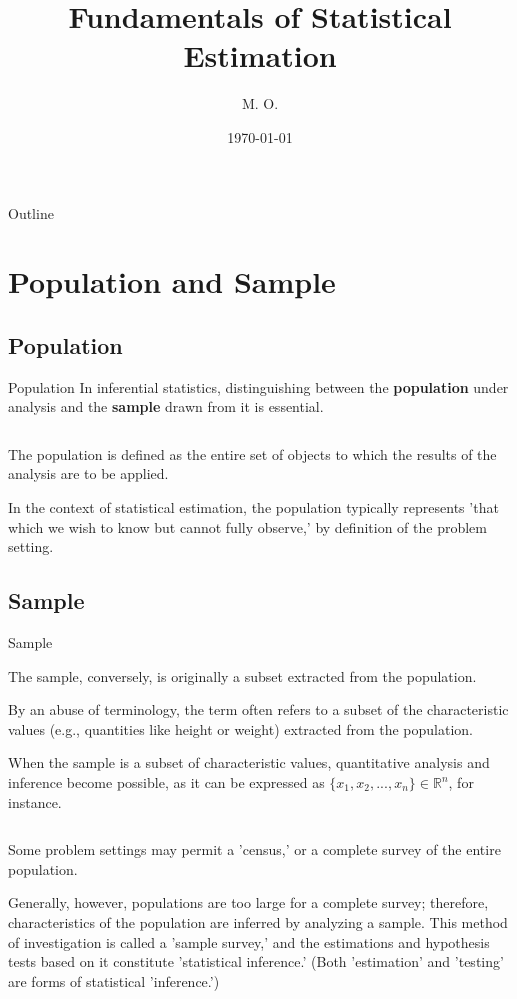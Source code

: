\documentclass[dvipdfmx, autodetect-engine, aspectratio=169, 10.5pt]{beamer}
\title{Fundamentals of Statistical Estimation}
\author{M. O.}
\date{\today}
\begin{document}
\begin{frame}[plain]
	\titlepage
\end{frame}

\begin{frame}{Outline}
	\tableofcontents
\end{frame}

\section{Population and Sample}

\subsection{Population}

\begin{frame}{Population}
	In inferential statistics, distinguishing between the \textbf{population} under analysis and the \textbf{sample} drawn from it is essential.

	${}$

	The population is defined as the entire set of objects to which the results of the analysis are to be applied.

	In the context of statistical estimation, the population typically represents 'that which we wish to know but cannot fully observe,' by definition of the problem setting.
\end{frame}

\subsection{Sample}

\begin{frame}{Sample}

	The sample, conversely, is originally a subset extracted from the population.

	By an abuse of terminology, the term often refers to a subset of the characteristic values (e.g., quantities like height or weight) extracted from the population.

	When the sample is a subset of characteristic values, quantitative analysis and inference become possible, as it can be expressed as $\{ x_{1}, x_{2}, ..., x_{n} \} \in \mathbb{R}^{n}$, for instance.

	${}$

	Some problem settings may permit a 'census,' or a complete survey of the entire population.

	Generally, however, populations are too large for a complete survey; therefore, characteristics of the population are inferred by analyzing a sample.
	This method of investigation is called a 'sample survey,' and the estimations and hypothesis tests based on it constitute 'statistical inference.'
	(Both 'estimation' and 'testing' are forms of statistical 'inference.')
\end{frame}
\end{document}
